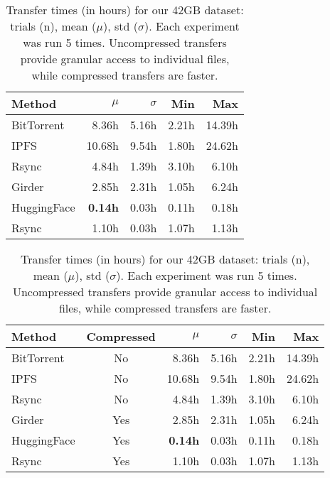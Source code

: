 \ifwacv
\begin{table}[hb]
\centering
\setlength{\tabcolsep}{4.5pt} %
\begin{tabular}{lrrrr}
\toprule
Method       & $\mu$     & $\sigma$ & Min    & Max     \\
\midrule       
BitTorrent   & 8.36h     & 5.16h    & 2.21h  & 14.39h  \\
IPFS         & 10.68h    & 9.54h    & 1.80h  & 24.62h  \\
Rsync        & 4.84h     & 1.39h    & 3.10h  & 6.10h   \\
Girder       & 2.85h     & 2.31h    & 1.05h  & 6.24h   \\
HuggingFace  & \bf{0.14h}& 0.03h    & 0.11h  & 0.18h   \\
Rsync        & 1.10h     & 0.03h    & 1.07h  & 1.13h   \\
\bottomrule
\end{tabular}
\caption{
Transfer times (in hours) for our 42GB dataset: trials (n), mean ($\mu$), std ($\sigma$).
Each experiment was run 5 times.
Uncompressed transfers provide granular access to individual files, while compressed transfers are faster.
}
\label{tab:transfertime}
\end{table}
\else
\begin{table}[hb]
\caption{
Transfer times (in hours) for our 42GB dataset: trials (n), mean ($\mu$), std ($\sigma$).
Each experiment was run 5 times.
Uncompressed transfers provide granular access to individual files, while compressed transfers are faster.
}
\label{tab:transfertime}
\centering
\setlength{\tabcolsep}{4.5pt} %
\begin{tabular}{lcrrrr}
\toprule
Method       & Compressed & $\mu$     & $\sigma$ & Min    & Max     \\
\midrule       
BitTorrent   & No         & 8.36h     & 5.16h    & 2.21h  & 14.39h  \\
IPFS         & No         & 10.68h    & 9.54h    & 1.80h  & 24.62h  \\
Rsync        & No         & 4.84h     & 1.39h    & 3.10h  & 6.10h   \\
Girder       & Yes        & 2.85h     & 2.31h    & 1.05h  & 6.24h   \\
HuggingFace  & Yes        & \bf{0.14h}& 0.03h    & 0.11h  & 0.18h   \\
Rsync        & Yes        & 1.10h     & 0.03h    & 1.07h  & 1.13h   \\
\bottomrule
\end{tabular}
\end{table}
\fi

